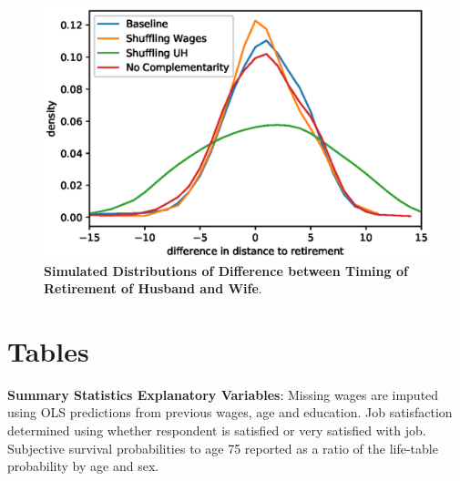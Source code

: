 \documentclass[11pt,letter]{article}
\begin{document}
\begin{figure}[!htbp]
\centering
\includegraphics[scale=0.75]{figures/compare_distances.eps}
\caption{\textbf{Simulated Distributions of Difference between Timing of Retirement of Husband and Wife}.}
\label{fig:compare}
\end{figure}

\clearpage
\section*{Tables}


\begin{table}[!htbp]
\centering

\caption{\textbf{Summary Statistics Explanatory Variables}: Missing wages are imputed using OLS predictions from previous wages, age and education. Job satisfaction determined using whether respondent is satisfied or very satisfied with job. Subjective survival probabilities to age 75 reported as a ratio of the life-table probability by age and sex.}
\label{tab:sumstats}
\end{table}
\end{document}
